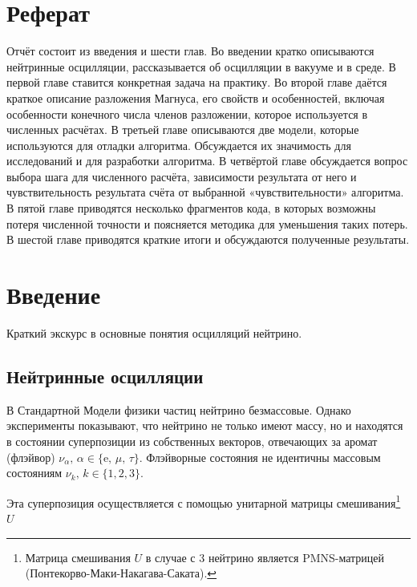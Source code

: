 \documentclass[12pt]{article}
\begin{document}
\newpage
\thispagestyle{empty}
\section*{Реферат}

Отчёт состоит из введения и шести глав. Во введении кратко описываются
нейтринные осцилляции, рассказывается об осцилляции в вакууме и в среде. В
первой главе ставится конкретная задача на практику. Во второй главе даётся
краткое описание разложения Магнуса, его свойств и особенностей, включая
особенности конечного числа членов разложении, которое используется в численных
расчётах. В третьей главе описываются две модели, которые используются для
отладки алгоритма. Обсуждается их значимость для исследований и для разработки
алгоритма. В четвёртой главе обсуждается вопрос выбора шага для численного
расчёта, зависимости результата от него и чувствительность результата счёта от
выбранной «чувствительности» алгоритма. В пятой главе приводятся несколько
фрагментов кода, в которых возможны потеря численной точности и поясняется
методика для уменьшения таких потерь. В шестой главе приводятся краткие итоги и
обсуждаются полученные результаты.

\newpage
\thispagestyle{empty}
\tableofcontents
\newpage

\setcounter{page}{4} %

\section*{Введение}
\indent

Краткий экскурс в основные понятия осцилляций нейтрино.

\subsection*{Нейтринные осцилляции}

В Стандартной Модели физики частиц нейтрино безмассовые. Однако эксперименты
показывают, что нейтрино не только имеют массу, но и находятся в состоянии
суперпозиции из собственных векторов, отвечающих за аромат (флэйвор)
$\nu_{\alpha},\,\alpha\!\in\!\{\text{e},\,\mu,\,\tau\}$. Флэйворные состояния не
идентичны массовым состояниям $\nu_{k},\,k\!\in\!\{1,2,3\}$.
	
Эта суперпозиция осуществляется с помощью унитарной матрицы смешивания\footnote
{Матрица смешивания $U$ в случае с 3 нейтрино является PMNS-матрицей
  (Понтекорво-Маки-Накагава-Саката).} $U$
\end{document}
